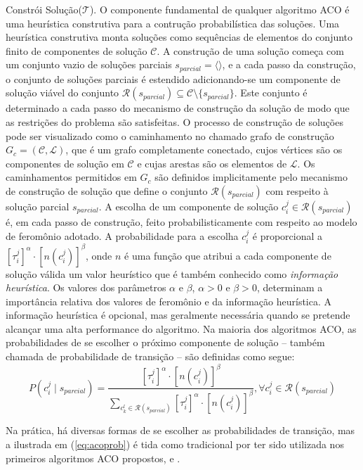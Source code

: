 Constrói Solução($\mathcal{T}$). O componente fundamental de qualquer algoritmo
ACO é uma heurística construtiva para a contrução probabilística das soluções.
Uma heurística construtiva monta soluções como sequências de elementos do
conjunto finito de componentes de solução $\mathcal{C}$. A construção de uma
solução começa com um conjunto vazio de soluções parciais $s_{parcial} =
\langle \rangle$, e a cada passo da construção, o conjunto de soluções parciais
é estendido adicionando-se um componente de solução viável do conjunto
$\mathcal{R}(s_{parcial}) \subseteq \mathcal{C} \setminus \{s_{parcial}\}$.
Este conjunto é determinado a cada passo do mecanismo de construção da solução
de modo que as restrições do problema são satisfeitas. O processo de construção
de soluções pode ser visualizado como o caminhamento no chamado grafo de
construção $G_{c} = (\mathcal{C}, \mathcal{L})$, que é um grafo completamente
conectado, cujos vértices são os componentes de solução em $\mathcal{C}$ e
cujas arestas são os elementos de $\mathcal{L}$. Os caminhamentos permitidos em
$G_{c}$ são definidos implicitamente pelo mecanismo de construção de solução
que define o conjunto $\mathcal{R}(s_{parcial})$ com respeito à solução parcial
$s_{parcial}$. A escolha de um componente de solução $c_{i}^{j} \in
\mathcal{R}(s_{parcial})$ é, em cada passo de construção, feito
probabilisticamente com respeito ao modelo de feromônio adotado. A
probabilidade para a escolha $c_{i}^{j}$ é proporcional a
$[\tau_{i}^{j}]^{\alpha} \cdot [n(c_{i}^{j})]^{\beta}$, onde $n$ é uma função
que atribui a cada componente de solução válida um valor heurístico que é
também conhecido como \textit{informação heurística}. Os valores dos parâmetros
$\alpha$ e $\beta$, $\alpha > 0$ e $\beta > 0$, determinam a importância
relativa dos valores de feromônio e da informação heurística. A informação
heurística é opcional, mas geralmente necessária quando se pretende alcançar
uma alta performance do algoritmo. Na maioria dos algoritmos ACO, as
probabilidades de se escolher o próximo componente de solução -- também chamada
de probabilidade de transição -- são definidas como segue:
\begin{equation}
\label{eq:acoprob}
P(c_{i}^{j} \mid s_{parcial}) = \frac{[\tau_{i}^{j}]^{\alpha} \cdot
[n(c_{i}^{j})]^{\beta}}{\sum_{c_{k}^{l} \in \mathcal{R}(s_{parcial})}
[\tau_{i}^{j}]^{\alpha} \cdot [n(c_{i}^{j})]^{\beta}}, \forall c_{i}^{j} \in
\mathcal{R}(s_{parcial})
\end{equation}

Na prática, há diversas formas de se escolher as probabilidades de transição,
mas a ilustrada em (\ref{eq:acoprob}) é tida como tradicional por ter sido
utilizada nos primeiros algoritmos ACO propostos, \cite{dorigo1991positive} e
\cite{dorigo1996ant}.

